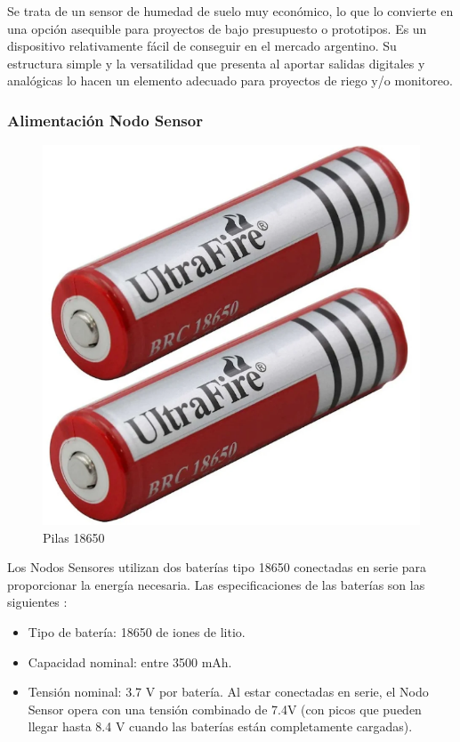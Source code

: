Se trata de un sensor de humedad de suelo muy económico, lo que lo convierte en una opción asequible para proyectos de bajo presupuesto o prototipos.
Es un dispositivo relativamente fácil de conseguir en el mercado argentino.
Su estructura simple y la versatilidad que presenta al aportar salidas digitales y analógicas lo hacen un elemento adecuado para proyectos de riego y/o monitoreo.

\subsubsection{Alimentación Nodo Sensor}

\begin{figure}[H]
	\centering
	\includegraphics[scale=0.6]{./Figures/Hardware/Alimentacion/pilas.png}
	\caption{Pilas 18650}
	\label{fig:pilas}
\end{figure}

\label{sec:AlimentacionNodoSensor}

Los Nodos Sensores utilizan dos baterías tipo 18650 conectadas en serie para proporcionar la energía necesaria. Las especificaciones de las baterías son las siguientes \cite{18650}:

\begin{itemize}
    \item Tipo de batería: 18650 de iones de litio.
    \item Capacidad nominal: entre  3500 mAh.
    \item Tensión nominal: 3.7 V por batería. Al estar conectadas en serie, el Nodo Sensor opera con una tensión combinado de 7.4V (con picos que pueden llegar hasta 8.4 V cuando las baterías están completamente cargadas).
\end{itemize}


